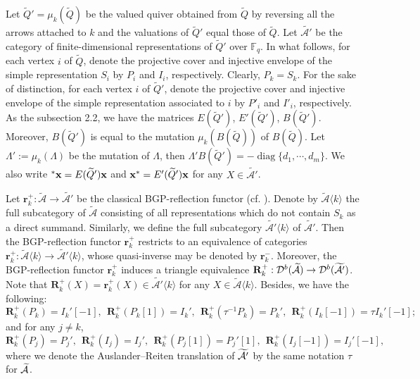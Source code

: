 \documentclass[reqno,12pt]{amsart}
\numberwithin{equation}{section}
\def\x{{\bf x}}
\theoremstyle{plain} %
\theoremstyle{definition} %
\begin{document}
Let $\widetilde{Q}'=\mu_k(\widetilde{Q})$ be the valued quiver obtained from $\widetilde{Q}$ by reversing all the arrows attached to $k$ and the valuations of
$\widetilde{Q}'$ equal those of $\widetilde{Q}$. Let $\widetilde{\mathcal{A}'}$ be the category of finite-dimensional representations of $\widetilde{Q}'$ over $\mathbb{F}_q$. In what follows, for each vertex $i$ of $\widetilde{Q}$, denote the projective cover and injective envelope of the simple representation $S_i$ by $P_i$ and $I_i$, respectively. Clearly, $P_k=S_k$. For the sake of distinction, for each vertex $i$ of $\widetilde{Q}'$, denote the projective cover and injective envelope of the simple representation associated to $i$ by $P'_i$ and $I'_i$, respectively.
As the subsection 2.2, we have the matrices $E(\widetilde{Q}')$, $E'(\widetilde{Q}')$, $B(\widetilde{Q}')$. Moreover, $B(\widetilde{Q}')$ is equal to the mutation $\mu_k(B(\widetilde{Q}))$ of $B(\widetilde{Q})$. Let ${\Lambda'}:=\mu_k(\Lambda)$ be the mutation of $\Lambda$, then $\Lambda'B(\widetilde{Q}')=-\operatorname{diag}\{d_1,\cdots, d_m\}$.
We also write $^\ast\x=E(\widetilde{Q}')\x$ and $\x^\ast=E'(\widetilde{Q}')\x$ for any $X\in\widetilde{\mathcal{A}'}$.

Let $\mathbf{r}_k^+:\widetilde{\mathcal{A}}\rightarrow\widetilde{\mathcal{A}'}$ be the classical BGP-reflection functor (cf. \cite{Dlab}). Denote by $\widetilde{\mathcal{A}}\langle k\rangle$ the full subcategory of $\widetilde{\mathcal{A}}$ consisting of all representations which do not contain $S_k$ as a direct summand. Similarly, we define the full subcategory $\widetilde{\mathcal{A}'}\langle k\rangle$ of $\widetilde{\mathcal{A}'}$. Then the BGP-reflection functor $\mathbf{r}_k^+$ restricts to an equivalence of categories $\mathbf{r}_k^+:\widetilde{\mathcal{A}}\langle k\rangle\rightarrow\widetilde{\mathcal{A}'}\langle k\rangle$, whose quasi-inverse may be denoted by $\mathbf{r}_k^-$. Moreover, the BGP-reflection functor $\mathbf{r}_k^+$ induces a triangle equivalence
$\mathbf{R}_k^+:\mathcal{D}^b(\widetilde{\mathcal{A}})\rightarrow\mathcal{D}^b(\widetilde{\mathcal{A}'})$. Note that $\mathbf{R}_k^+(X)=\mathbf{r}_k^+(X)\in\widetilde{\mathcal{A}'}\langle k\rangle$ for any $X\in\widetilde{\mathcal{A}}\langle k\rangle$. Besides, we have the following:
\begin{equation}\label{6.1}
\mathbf{R}_k^+(P_k)=I_k'[-1],~~\mathbf{R}_k^+(P_k[1])=I_k',~~\mathbf{R}_k^+(\tau^{-1}P_k)=P_k',~~\mathbf{R}_k^+(I_k[-1])=\tau I_k'[-1];
\end{equation}
and for any $j\neq k$,
\begin{equation}
\mathbf{R}_k^+(P_j)=P_j',~~\mathbf{R}_k^+(I_j)=I_j',~~\mathbf{R}_k^+(P_j[1])=P_j'[1],~~\mathbf{R}_k^+(I_j[-1])=I_j'[-1],
\end{equation}
where we denote the Auslander--Reiten translation of $\widetilde{\mathcal{A}'}$ by the same notation $\tau$ for $\widetilde{\mathcal{A}}$.
\end{document}
